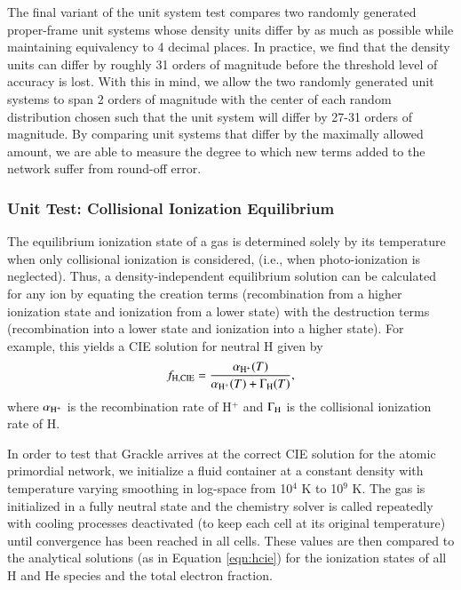 The final variant of the unit system test compares two randomly
generated proper-frame unit systems whose density units differ by as
much as possible while maintaining equivalency to 4 decimal places.
In practice, we find that the density units can differ by roughly 31
orders of magnitude before the threshold level of accuracy is lost.
With this in mind, we allow the two randomly generated unit systems to
span 2 orders of magnitude with the center of each random distribution
chosen such that the unit system will differ by 27-31 orders of
magnitude.  By comparing unit systems that differ by the maximally
allowed amount, we are able to measure the degree to which new terms
added to the network suffer from round-off error.

\subsubsection{Unit Test: Collisional Ionization Equilibrium}
\label{sec:test-cie}

The equilibrium ionization state of a gas is determined solely by its
temperature when only collisional ionization is considered, (i.e.,
when photo-ionization is neglected).  Thus, a density-independent
equilibrium solution can be calculated for any ion by equating the
creation terms (recombination from a higher ionization state and 
ionization from a lower state) with the destruction terms
(recombination into a lower state and ionization into a higher
state).  For example, this yields a CIE solution for neutral H given
by
\begin{equation} \label{eqn:hcie}
f_{\rm H,CIE} = \frac{\alpha_{\rm H^{+}}(T)}{\alpha_{\rm H^{+}}(T) +
  \Gamma_{\rm H}(T)},
\end{equation}
where $\alpha_{\rm H^{+}}$ is the recombination rate of H$^{+}$ and
$\Gamma_{\rm H}$ is the collisional ionization rate of H.

In order to test that Grackle arrives at the correct CIE solution for
the atomic primordial network, we initialize a fluid container at a
constant density with temperature varying smoothing in log-space from
10$^{4}$ K to 10$^{9}$ K.  The gas is initialized in a fully neutral
state and the chemistry solver is called repeatedly with cooling
processes deactivated (to keep each cell at its original temperature)
until convergence has been reached in all cells.  These values are
then compared to the analytical solutions (as in Equation
\ref{eqn:hcie}) for the ionization states of all H and He species and
the total electron fraction.

